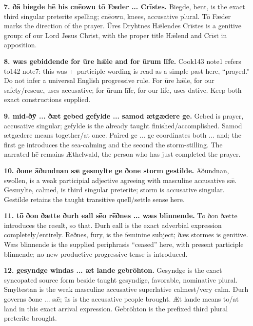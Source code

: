 \textbf{7. ðā biegde hē his cnēowu tō Fæder ... Crīstes.} Biegde, bent, is the exact third singular preterite spelling; cnēowu, knees, accusative plural. Tō Fæder marks the direction of the prayer. Ūres Dryhtnes Hǣlendes Crīstes is a genitive group: of our Lord Jesus Christ, with the proper title Hǣlend and Crīst in apposition.

\textbf{8. wæs gebiddende for ūre hǣle and for ūrum līfe.} Cook143 note1 refers to142 note7: this was + participle wording is read as a simple past here, “prayed.” Do not infer a universal English progressive rule. For ūre hǣle, for our safety/\allowbreak{}rescue, uses accusative; for ūrum līfe, for our life, uses dative. Keep both exact constructions supplied.

\textbf{9. mid-ðȳ ... ðæt gebed gefylde ... samod ætgædere ge.} Gebed is prayer, accusative singular; gefylde is the already taught finished/\allowbreak{}accomplished. Samod ætgædere means together/\allowbreak{}at once. Paired ge ... ge coordinates both ... and; the first ge introduces the sea-calming and the second the storm-stilling. The narrated hē remains Æthelwald, the person who has just completed the prayer.

\textbf{10. ðone āðundnan sǣ gesmylte ge ðone storm gestilde.} Āðundnan, swollen, is a weak participial adjective agreeing with masculine accusative sǣ. Gesmylte, calmed, is third singular preterite; storm is accusative singular. Gestilde retains the taught transitive quell/\allowbreak{}settle sense here.

\textbf{11. tō ðon ðætte ðurh eall sēo rēðnes ... wæs blinnende.} Tō ðon ðætte introduces the result, so that. Ðurh eall is the exact adverbial expression completely/\allowbreak{}entirely. Rēðnes, fury, is the feminine subject; ðæs stormes is genitive. Wæs blinnende is the supplied periphrasis “ceased” here, with present participle blinnende; no new productive progressive tense is introduced.

\textbf{12. gesyndge windas ... æt lande gebrōhton.} Gesyndge is the exact syncopated source form beside taught gesyndige, favorable, nominative plural. Smyltestan is the weak masculine accusative superlative calmest/\allowbreak{}very calm. Ðurh governs ðone ... sǣ; ūs is the accusative people brought. Æt lande means to/\allowbreak{}at land in this exact arrival expression. Gebrōhton is the prefixed third plural preterite brought.

